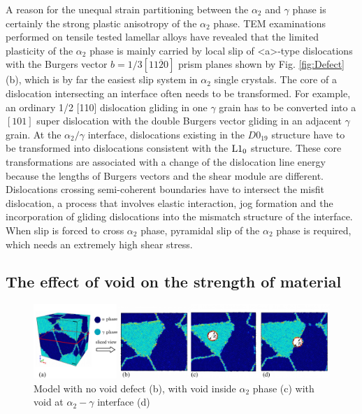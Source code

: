 \documentclass[Unknown,article,submit,moreauthors,pdftex,10pt,a4paper]{Definitions/mdpi}
\begin{document}
A reason for the unequal strain partitioning between the $\alpha_2$ and $\gamma$ phase is certainly the strong plastic anisotropy of the $\alpha_2$ phase. TEM examinations performed on tensile tested lamellar alloys have revealed that the limited plasticity of the $\alpha_2$ phase is mainly carried by local slip of <a>-type dislocations with the Burgers vector $b=1/3[11\overline{2}0]$ prism planes shown by Fig. \ref{fig:Defect}(b), which is by far the easiest slip system in $\alpha_2$ single crystals.  The core of a dislocation intersecting an interface often needs to be transformed. For example, an ordinary 1/2 [110] dislocation gliding in one $\gamma$ grain has to be converted into a $[101]$ super dislocation with the double Burgers vector gliding in an adjacent $\gamma$ grain. At the $\alpha_2/\gamma$ interface, dislocations existing in the $D0_{19}$ structure have to be transformed into dislocations consistent with the $\rm{L1_0}$ structure. These core transformations are associated with a change of the dislocation line energy because the lengths of Burgers vectors and the shear module are different. Dislocations crossing semi-coherent boundaries have to intersect the misfit dislocation, a process that involves elastic interaction, jog formation and the incorporation of gliding dislocations into the mismatch structure of the interface. When slip is forced to cross $\alpha_2$ phase, pyramidal slip of the $\alpha_2$ phase is required, which needs an extremely high shear stress.


\subsection{The effect of void on the strength of material}

\begin{figure}[ht]
	\centeringz
	\includegraphics[width=1\linewidth]{img/slice-view}
	\caption{ Model with no void defect (b), with void inside $\alpha_2$ phase (c) with void at $\alpha_2-\gamma$ interface (d)}
	\label{fig:model-creation}
\end{figure}
\end{document}

